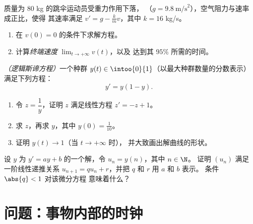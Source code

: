 \begin{exercise}[$\star\star$]\label{exo:g12:diffeq:7}
质量为 $80$ kg 的跳伞运动员受重力作用下落，
（$g = 9.8\ \text{m/s}^2$），空气阻力与速率成正比，使得
其速率满足 $v' = g - \frac{k}{m}v$，其中 $k = 16$ kg/s。
\begin{enumerate}
  \item 在 $v(0) = 0$ 的条件下求解方程。
  \item 计算\emph{终端速度} $\lim_{t\to+\infty} v(t)$，以及
        达到其 $95\%$ 所需的时间。
\end{enumerate}
\end{exercise}

\begin{exercise}[$\star\star\star$]\label{exo:g12:diffeq:8}
\emph{（逻辑斯谛方程）}一个种群 $y(t) \in \intoo{0}{1}$（以最大种群数量的分数表示）
满足下列方程：
\[
y' = y(1 - y).
\]
\begin{enumerate}
  \item 令 $z = \dfrac{1}{y}$，证明 $z$ 满足线性方程
        $z' = -z + 1$。
  \item 求 $z$，再求 $y$，其中 $y(0) = \frac{1}{10}$。
  \item 证明 $y(t) \to 1$（当 $t \to +\infty$ 时），
        并大致画出解曲线的形状。
\end{enumerate}
\end{exercise}

\begin{exercise}[$\star\star\star$]\label{exo:g12:diffeq:9}
设 $y$ 为 $y' = ay + b$ 的一个解，令 $u_n = y(n)$，其中 $n \in \N$。
证明 $(u_n)$ 满足一阶线性递推关系
$u_{n+1} = q u_n + r$，并把 $q$ 和 $r$ 用 $a$ 和 $b$ 表示。
条件 $\abs{q} < 1$ 对该微分方程
意味着什么？
\end{exercise}

\section{问题：事物内部的时钟}

